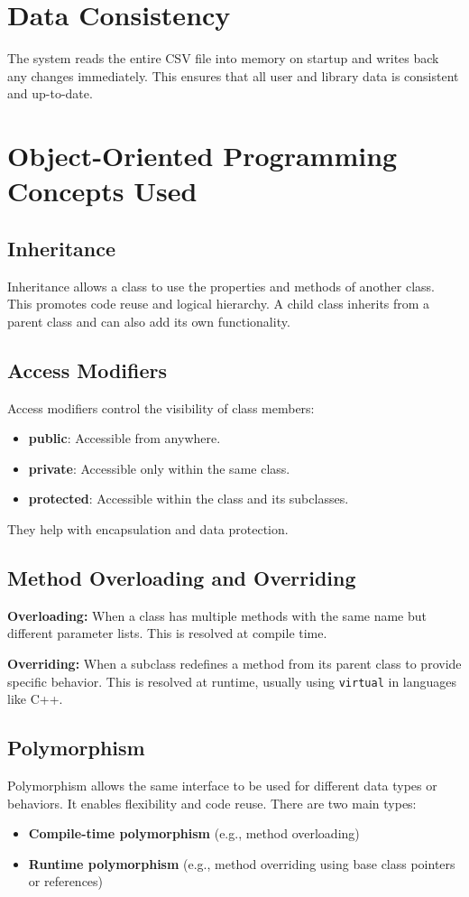\documentclass[a4paper,12pt]{article}
\begin{document}
\section{Data Consistency}
The system reads the entire CSV file into memory on startup and writes back any changes immediately. This ensures that all user and library data is consistent and up-to-date.

\section{Object-Oriented Programming Concepts Used}

\subsection{Inheritance}
Inheritance allows a class to use the properties and methods of another class. This promotes code reuse and logical hierarchy. A child class inherits from a parent class and can also add its own functionality.

\subsection{Access Modifiers}
Access modifiers control the visibility of class members:
\begin{itemize}
    \item \textbf{public}: Accessible from anywhere.
    \item \textbf{private}: Accessible only within the same class.
    \item \textbf{protected}: Accessible within the class and its subclasses.
\end{itemize}
They help with encapsulation and data protection.

\subsection{Method Overloading and Overriding}
\textbf{Overloading:} When a class has multiple methods with the same name but different parameter lists. This is resolved at compile time.

\textbf{Overriding:} When a subclass redefines a method from its parent class to provide specific behavior. This is resolved at runtime, usually using \texttt{virtual} in languages like C++.

\subsection{Polymorphism}
Polymorphism allows the same interface to be used for different data types or behaviors. It enables flexibility and code reuse. There are two main types:
\begin{itemize}
    \item \textbf{Compile-time polymorphism} (e.g., method overloading)
    \item \textbf{Runtime polymorphism} (e.g., method overriding using base class pointers or references)
\end{itemize}
\end{document}
